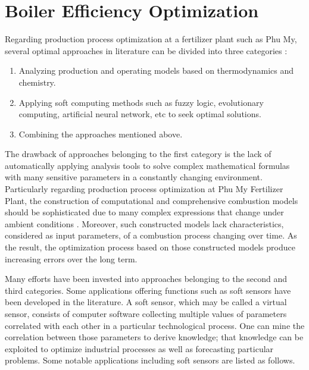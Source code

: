 \section{Boiler Efficiency Optimization}

Regarding production process optimization at a fertilizer plant such as Phu My, several optimal approaches in literature can be divided into three categories \cite{boi:ref_09, boi:ref_12}:

\begin{enumerate}

\item Analyzing production and operating models based on thermodynamics and chemistry.
\item Applying soft computing methods such as fuzzy logic, evolutionary computing, artificial neural network, etc to seek optimal solutions.
\item Combining the approaches mentioned above.

\end{enumerate}

The drawback of approaches belonging to the first category is the lack of automatically applying analysis tools to solve complex mathematical formulas with many sensitive parameters in a constantly changing environment. Particularly regarding production process optimization at Phu My Fertilizer Plant, the construction of computational and comprehensive combustion models should be sophisticated due to many complex expressions that change under ambient conditions \cite{boi:ref_08}. Moreover, such constructed models lack characteristics, considered as input parameters, of a combustion process changing over time. As the result, the optimization process based on those constructed models produce increasing errors over the long term. 

Many efforts have been invested into approaches belonging to the second and third categories. Some applications offering functions such as soft sensors have been developed in the literature. A soft sensor, which may be called a virtual sensor, consists of computer software collecting multiple values of parameters correlated with each other in a particular technological process. One can mine the correlation between those parameters to derive knowledge; that knowledge can be exploited to optimize industrial processes as well as forecasting particular problems. Some notable applications including soft sensors are listed as follows.

